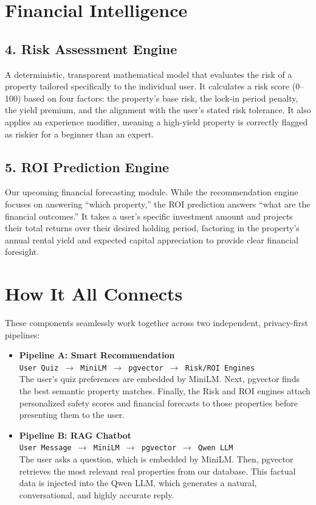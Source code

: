 \documentclass[12pt,a4paper]{article}
\begin{document}
\section*{Financial Intelligence}

\subsection*{4. Risk Assessment Engine}
A deterministic, transparent mathematical model that evaluates the risk of a property tailored specifically to the individual user. It calculates a risk score (0--100) based on four factors: the property's base risk, the lock-in period penalty, the yield premium, and the alignment with the user's stated risk tolerance. It also applies an experience modifier, meaning a high-yield property is correctly flagged as riskier for a beginner than an expert.

\subsection*{5. ROI Prediction Engine}
Our upcoming financial forecasting module. While the recommendation engine focuses on answering ``which property,'' the ROI prediction answers ``what are the financial outcomes.'' It takes a user's specific investment amount and projects their total returns over their desired holding period, factoring in the property's annual rental yield and expected capital appreciation to provide clear financial foresight.

\section*{How It All Connects}
These components seamlessly work together across two independent, privacy-first pipelines:

\begin{itemize}[leftmargin=*]
    \item \textbf{Pipeline A: Smart Recommendation}\\
    \texttt{User Quiz $\rightarrow$ MiniLM $\rightarrow$ pgvector $\rightarrow$ Risk/ROI Engines}\\
    The user's quiz preferences are embedded by MiniLM. Next, pgvector finds the best semantic property matches. Finally, the Risk and ROI engines attach personalized safety scores and financial forecasts to those properties before presenting them to the user.

    \vspace{0.5em}
    \item \textbf{Pipeline B: RAG Chatbot}\\
    \texttt{User Message $\rightarrow$ MiniLM $\rightarrow$ pgvector $\rightarrow$ Qwen LLM}\\
    The user asks a question, which is embedded by MiniLM. Then, pgvector retrieves the most relevant real properties from our database. This factual data is injected into the Qwen LLM, which generates a natural, conversational, and highly accurate reply.
\end{itemize}
\end{document}
